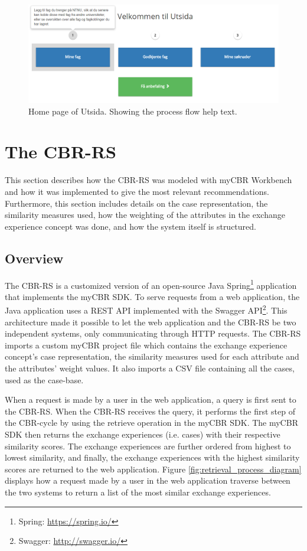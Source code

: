 \begin{figure}[h]
    \centering
    \includegraphics[width=1\textwidth]{fig/utsida_screenshots/steps.png}
    \caption[Home page of Utsida]{Home page of Utsida. Showing the process flow help text.}
    \label{fig:utsida_index}
\end{figure}

\section{The CBR-RS}

This section describes how the CBR-RS was modeled with myCBR Workbench and how it was implemented to give the most relevant recommendations. Furthermore, this section includes details on the case representation, the similarity measures used, how the weighting of the attributes in the exchange experience concept was done, and how the system itself is structured.

\subsection{Overview}

The CBR-RS is a customized version of an open-source Java Spring\footnote{Spring: \url{https://spring.io/}} application that implements the myCBR SDK. To serve requests from a web application, the Java application uses a REST API implemented with the Swagger API\footnote{Swagger: \url{http://swagger.io/}}. This architecture made it possible to let the web application and the CBR-RS be two independent systems, only communicating through HTTP requests. The CBR-RS imports a custom myCBR project file which contains the exchange experience concept's case representation, the similarity measures used for each attribute and the attributes' weight values. It also imports a CSV file containing all the cases, used as the case-base.

When a request is made by a user in the web application, a query is first sent to the CBR-RS. When the CBR-RS receives the query, it performs the first step of the CBR-cycle by using the retrieve operation in the myCBR SDK. The myCBR SDK then returns the exchange experiences (i.e. cases) with their respective similarity scores. The exchange experiences are further ordered from highest to lowest similarity, and finally, the exchange experiences with the highest similarity scores are returned to the web application. Figure \ref{fig:retrieval_process_diagram} displays how a request made by a user in the web application traverse between the two systems to return a list of the most similar exchange experiences.

